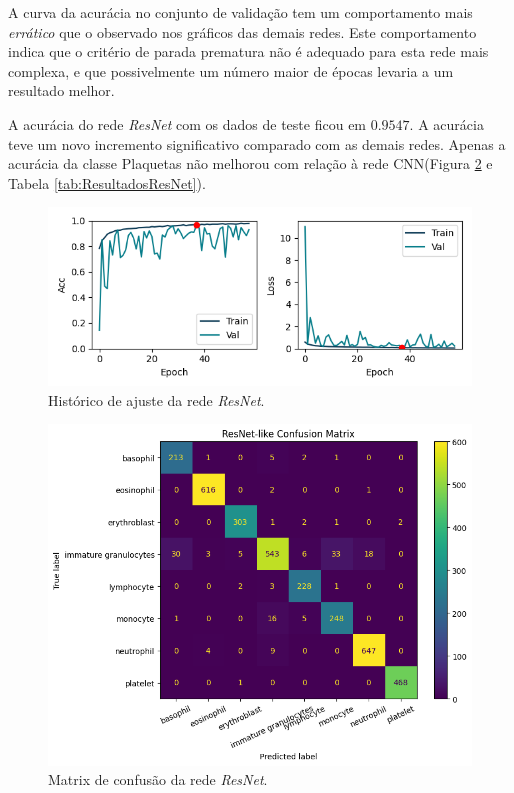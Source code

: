 \documentclass[final,5p]{elsarticle}
\numberwithin{equation}{section}
\begin{document}
    A curva da acurácia no conjunto de validação tem um comportamento mais \emph{errático} que o observado nos gráficos das demais redes. Este comportamento indica que o critério de parada prematura não é adequado para esta rede mais complexa, e que possivelmente um número maior de épocas levaria a um resultado melhor.

    A acurácia do rede \emph{ResNet} com os dados de teste ficou em $0.9547$. A acurácia teve um novo incremento significativo comparado com as demais redes. Apenas a acurácia da classe Plaquetas não melhorou com relação à rede CNN(Figura \ref{fig:MatrizConfusaoResNet} e Tabela \ref{tab:ResultadosResNet}).

    \begin{figure}[hbt!]
        \includegraphics[width=0.95\columnwidth]{ResNet_history_cropped.png}
        \caption{Histórico de ajuste da rede \emph{ResNet}.}\label{fig:HistoricoResNet}
    \end{figure}

    \begin{figure}[hbt!]
        \includegraphics[width=0.95\columnwidth]{ResNet_cm.png}
        \caption{Matrix de confusão da rede \emph{ResNet}.}\label{fig:MatrizConfusaoResNet}
    \end{figure}
\end{document}
